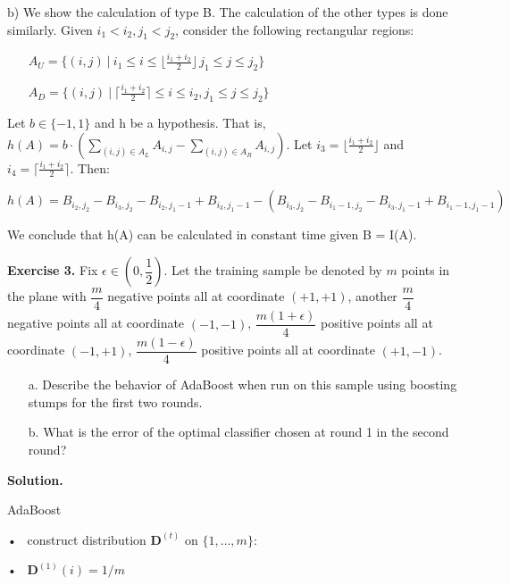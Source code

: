 \documentclass{article}
\newcommand{\<}{\langle}
\renewcommand{\>}{\rangle}
\theoremstyle{definition}
\newcommand{\sft}[2]{\{#1, \dots, #2\}}
\newcommand{\som}{\sft{1}{m}}
\newcommand{\sft}[2]{\{#1, \dots, #2\}}
\newcommand{\som}{\sft{1}{m}}
\newcommand{\bdt}{\mathbf{D}^{(t)}}
\newcommand{\bdoi}{\mathbf{D}^{(1)}(i)}
\begin{document}
b) We show the calculation of type B. The calculation of the other types is done similarly. Given $i_1 < i_2 , j_1 < j_2$, consider the following rectangular regions:

\begin{itemize}
    \item[] $A_U = \{(i,j) \ | \ i_1 \leq i \leq \lfloor \frac{i_1 + i_2}{2} \rfloor \, j_1 \leq j \leq j_2\}$
    \item[] $A_D = \{(i,j) \ | \ \lceil \frac{i_1 + i_2}{2} \rceil \leq i \leq i_2, j_1 \leq j \leq j_2\}$
\end{itemize}

Let $b \in \{-1, 1\}$ and h be a hypothesis. That is, $h(A) = b \cdot (\sum_{(i,j) \in A_L} A_{i,j} - \sum_{(i,j) \in A_R} A_{i,j})$. Let $i_3 = \lfloor \frac{i_1 + i_2}{2} \rfloor$ and $i_4 = \lceil \frac{i_1 + i_2}{2} \rceil$. Then:

$$h(A) = B_{i_2, j_2} - B_{i_3, j_2} - B_{i_2, j_1 - 1} + B_{i_3, j_1 - 1} - (B_{i_3, j_2} - B_{i_1 - 1, j_2} - B_{i_3, j_1 - 1} + B_{i_1 - 1, j_1 - 1})$$

We conclude that h(A) can be calculated in constant time given B = I(A).

\vspace{3mm}

\textbf{Exercise 3.} Fix $\epsilon \in \left(0, \dfrac{1}{2}\right)$. Let the training sample be denoted by
$m$ points in the plane with $\dfrac{m}{4}$ negative points all at coordinate $(+1, +1)$,
another $\dfrac{m}{4}$ negative points all at coordinate $(-1, -1)$,
$\dfrac{m(1+\epsilon)}{4}$ positive points all at coordinate $(-1, +1)$,
$\dfrac{m(1-\epsilon)}{4}$ positive points all at coordinate $(+1, -1)$.

\begin{enumerate}[label=\alph*.]
  \item[a.] Describe the behavior of AdaBoost when run on this sample using boosting stumps
  for the first two rounds.
  \item[b.] What is the error of the optimal classifier chosen at round 1 in the second round?
\end{enumerate}

\textbf{Solution.} 

\begin{center}
{\Large AdaBoost}
\end{center}

• \, construct distribution $\bdt$ on $\som$:

\quad • \, $\bdoi = 1/m$
\end{document}

